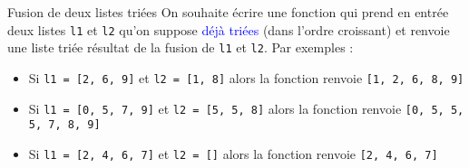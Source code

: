 \documentclass[10pt]{beamer}
\begin{document}
\begin{frame}{\Ctitle}{\stitle}
	\begin{exampleblock}{Fusion de deux listes triées}
		On souhaite écrire une fonction qui prend en entrée deux listes {\tt l1} et {\tt l2} qu'on suppose \textcolor{blue}{déjà triées} (dans l'ordre croissant) et renvoie une liste triée résultat de la fusion de {\tt l1} et {\tt l2}. Par exemples :
		\begin{itemize}
		\item<2-> Si {\tt l1 = [2, 6, 9]} et {\tt l2 = [1, 8]} alors la fonction renvoie {\tt [1, 2, 6, 8, 9]}
		\item<3-> Si {\tt l1 = [0, 5, 7, 9]} et {\tt l2 = [5, 5, 8]} alors la fonction renvoie {\tt [0, 5, 5, 5, 7, 8, 9]}
		\item<4-> Si {\tt l1 = [2, 4, 6, 7]} et {\tt l2 = []} alors la fonction renvoie {\tt [2, 4, 6, 7]}
		\end{itemize}
	\end{exampleblock}
\end{frame}
\end{document}
